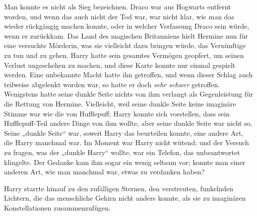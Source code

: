 Man konnte es nicht als Sieg bezeichnen. Draco war aus Hogwarts entfernt worden, und wenn das auch nicht der Tod war, war nicht klar, wie man das wieder rückgängig machen konnte, oder in welcher Verfassung Draco sein würde, wenn er zurückkam. Das Land des magischen Britanniens hielt Hermine nun für eine versuchte Mörderin, was sie vielleicht dazu bringen würde, das Vernünftige zu tun und zu gehen. Harry hatte sein gesamtes Vermögen geopfert, um seinen Verlust ungeschehen zu machen, und diese Karte konnte nur einmal gespielt werden.
Eine unbekannte Macht hatte ihn getroffen, und wenn dieser Schlag auch teilweise abgelenkt worden war, so hatte er doch \emph{sehr schwer} getroffen.
Wenigstens hatte seine dunkle Seite nichts von ihm verlangt als Gegenleistung für die Rettung von Hermine. Vielleicht, weil seine dunkle Seite keine imaginäre Stimme war wie die von Hufflepuff; Harry konnte sich vorstellen, dass sein Hufflepuff-Teil andere Dinge von ihm wollte, aber seine dunkle Seite war nicht so. Seine „dunkle Seite“ war, soweit Harry das beurteilen konnte, eine andere Art, die Harry manchmal war. Im Moment war Harry nicht wütend; und der Versuch zu fragen, was der „dunkle Harry“ wollte, war ein Telefon, das unbeantwortet klingelte. Der Gedanke kam ihm sogar ein wenig seltsam vor; konnte man einer anderen Art, wie man manchmal war, etwas zu verdanken haben?

Harry starrte hinauf zu den zufälligen Sternen, den verstreuten, funkelnden Lichtern, die das menschliche Gehirn nicht anders konnte, als sie zu imaginären Konstellationen zusammenzufügen.

